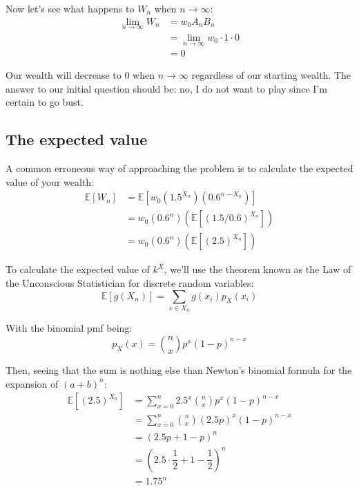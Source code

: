 \documentclass[12pt]{article}
\begin{document}
Now let's see what happens to $W_n$ when $n \rightarrow \infty$:
\begin{equation*}
  \begin{split}
    \lim_{n\to\infty} W_n &= w_0 A_n  B_n\\
    & = \lim_{n\to\infty} w_0 \cdot 1 \cdot 0 \\
    & = 0
  \end{split}
\end{equation*}
  
Our wealth will decrease to 0 when $n\to\infty$ regardless of our starting wealth. The answer to our initial question should be: no, I do not want to play since I'm certain to go bust.

\subsection{The expected value}
A common erroneous way of approaching the problem is to calculate the expected value of your wealth:
\begin{equation*}
  \begin{split}
    \mathbb{E}[W_n] &= \mathbb{E}[w_0 \left(1.5^{X_n}\right) \left(0.6^{n-X_n}\right)]\\
    & = w_0  \left(0.6^n\right) \left(\mathbb{E}[(1.5/0.6)^{X_n}]\right)\\
    & = w_0 \left(0.6^n\right) \left(\mathbb{E}[(2.5)^{X_n}]\right)
  \end{split}
\end{equation*}

To calculate the expected value of $k^X$, we'll use the theorem known as the Law of the Unconscious Statistician for discrete random variables:
\begin{equation}
    \mathbb{E}[g(X_n)] = \sum\limits_{x \in X_n} g(x_i) p_X(x_i)
\end{equation}

With the binomial pmf being:
\begin{equation}
    p_X(x) = {n \choose x} p^x (1-p)^{n-x}
\end{equation}

Then, seeing that the sum is nothing else than Newton's binomial formula for the expansion of $(a+b)^n$:
\begin{equation*}
  \begin{split}
    \mathbb{E}[(2.5)^{X_n}] &= \sum\limits_{x=0}^{n} 2.5^x {n \choose x} p^x (1-p)^{n-x}\\
    &= \sum\limits_{x=0}^{n} {n \choose x} (2.5p)^x (1-p)^{n-x}\\
    &= (2.5p + 1 - p)^n \\ 
    &= (2.5 \cdot \dfrac{1}{2} + 1 - \dfrac{1}{2})^n\\
    & = 1.75^n
  \end{split}
\end{equation*}
\end{document}
